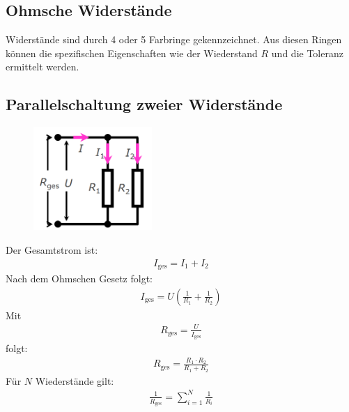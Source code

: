 \documentclass{scrartcl}
\begin{document}
\subsection{Ohmsche Widerstände}
Widerstände sind durch 4 oder 5 Farbringe gekennzeichnet. Aus diesen Ringen können die spezifischen Eigenschaften 
wie der Wiederstand $R$ und die Toleranz ermittelt werden.

\subsection{Parallelschaltung zweier Widerstände}
\begin{figure}[H]
    \centering
    \includegraphics[width=0.4\textwidth]{parallelschaltung.png}
\end{figure}
Der Gesamtstrom ist:
\begin{align}
    I_\text{ges}=I_1+I_2
\end{align}
Nach dem Ohmschen Gesetz folgt:
\begin{align}
    I_\text{ges}=U\left(\frac{1}{R_1}+\frac{1}{R_2}\right)
\end{align}
Mit 
\begin{align}
    R_\text{ges}=\frac{U}{I_\text{ges}}
\end{align}
folgt:
\begin{align}
    R_\text{ges}=\frac{R_1\cdot R_2}{R_1+R_2}
\end{align}
Für $N$ Wiederstände gilt:
\begin{align}
    \frac{1}{R_\text{ges}}=\sum_{i=1}^{N}\frac{1}{R_i}
\end{align}
\end{document}
